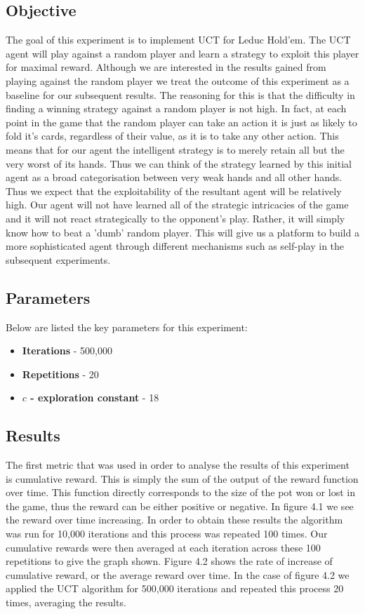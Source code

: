 \subsection{Objective}\label{subsec:objective1}
The goal of this experiment is to implement UCT for Leduc Hold'em.
The UCT agent will play against a random player and learn a strategy to exploit this player for
maximal reward.
Although we are interested in the results gained from playing against the random player we treat the
outcome of this experiment as a baseline for our subsequent results.
The reasoning for this is that the difficulty in finding a winning strategy against a random player
is not high.
In fact, at each point in the game that the random player can take an action it is
just as likely to fold it's cards, regardless of their value, as it is to take any other action.
This means that for our agent the intelligent strategy is to merely retain all but the
very worst of its hands.
Thus we can think of the strategy learned by this initial agent as a broad
categorisation between very weak hands and all other hands.
Thus we expect that the exploitability of the resultant agent will be relatively high.
Our agent will not have learned all of the strategic intricacies of the game
and it will not react strategically to the opponent's play.
Rather, it will simply know how to beat a 'dumb' random player.
This will give us a platform to build a more sophisticated agent through different mechanisms such as
self-play in the subsequent experiments.

\subsection{Parameters}\label{subsec:algAndCoding1}
Below are listed the key parameters for this experiment:
\begin{itemize}
    \item \textbf{Iterations} - 500,000
    \item \textbf{Repetitions} - 20
    \item \textbf{$c$ - exploration constant} - 18
\end{itemize}

\subsection{Results}\label{subsec:results1}
The first metric that was used in order to analyse the results of this experiment is cumulative reward.
This is simply the sum of the output of the reward function over time.
This function directly corresponds to the size of the pot won or lost in the game,
thus the reward can be either positive or negative.
In figure 4.1 we see the reward over time increasing.
In order to obtain these results the algorithm was run for 10,000 iterations and this process was repeated 100 times.
Our cumulative rewards were then averaged at each iteration across these 100 repetitions to give the graph shown.
Figure 4.2 shows the rate of increase of cumulative reward, or the average reward over time.
In the case of figure 4.2 we applied the UCT algorithm for 500,000 iterations and
repeated this process 20 times, averaging the results.

